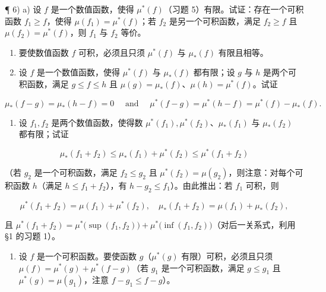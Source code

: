 ¶ 6) a) 设 \(f\) 是一个数值函数，使得 \(\mu^{*}(f)\)（习题 5）有限。试证：存在一个可积函数 \(f_{1} \geqslant f\)，使得 \(\mu(f_{1}) = \mu^{*}(f)\)；若 \(f_{2}\) 是另一个可积函数，满足 \(f_{2} \geqslant f\) 且 \(\mu(f_{2}) = \mu^{*}(f)\)，则 \(f_{1}\) 与 \(f_{2}\) 等价。

\begin{enumerate}
\def\labelenumi{\alph{enumi})}
\setcounter{enumi}{1}
\item
  要使数值函数 \(f\) 可积，必须且只须 \(\mu^{*}(f)\) 与 \(\mu_{*}(f)\) 有限且相等。
\item
  设 \(f\) 是一个数值函数，使得 \(\mu^{*}(f)\) 与 \(\mu_{*}(f)\) 都有限；设 \(g\) 与 \(h\) 是两个可积函数，满足 \(g \leqslant f \leqslant h\) 且 \(\mu(g) = \mu_{*}(f)\)、\(\mu(h) = \mu^{*}(f)\)。试证
\end{enumerate}

\[
\mu_ {*} (f - g) = \mu_ {*} (h - f) = 0 \quad \text { and } \quad \mu^ {*} (f - g) = \mu^ {*} (h - f) = \mu^ {*} (f) - \mu_ {*} (f).
\]

\begin{enumerate}
\def\labelenumi{\alph{enumi})}
\setcounter{enumi}{3}
\tightlist
\item
  设 \(f_{1}, f_{2}\) 是两个数值函数，使得数 \(\mu^{*}(f_{1}), \mu^{*}(f_{2})\)、\(\mu_{*}(f_{1})\) 与 \(\mu_{*}(f_{2})\) 都有限；试证
\end{enumerate}

\[
\mu_ {*} (f _ {1} + f _ {2}) \leqslant \mu_ {*} (f _ {1}) + \mu^ {*} (f _ {2}) \leqslant \mu^ {*} (f _ {1} + f _ {2})
\]

（若 \(g_2\) 是一个可积函数，满足 \(f_2 \leqslant g_2\) 且 \(\mu^*(f_2) = \mu(g_2)\)，则注意：对每个可积函数 \(h\)（满足 \(h \leqslant f_1 + f_2\)），有 \(h - g_2 \leqslant f_1\)）。由此推出：若 \(f_1\) 可积，则

\[
\mu^ {*} (f _ {1} + f _ {2}) = \mu (f _ {1}) + \mu^ {*} (f _ {2}), \quad \mu_ {*} (f _ {1} + f _ {2}) = \mu (f _ {1}) + \mu_ {*} (f _ {2}),
\]

且 \(\mu^{*}(f_{1} + f_{2}) = \mu^{*}\big(\sup (f_{1},f_{2})\big) + \mu^{*}\big(\inf (f_{1},f_{2})\big)\)（对后一关系式，利用 §1 的习题 1）。

\begin{enumerate}
\def\labelenumi{\alph{enumi})}
\setcounter{enumi}{4}
\tightlist
\item
  设 \(f\) 是一个可积函数。要使函数 \(g\)（\(\mu^{*}(g)\) 有限）可积，必须且只须 \(\mu(f) = \mu^{*}(g) + \mu^{*}(f - g)\)（若 \(g_{1}\) 是一个可积函数，满足 \(g \leqslant g_{1}\) 且 \(\mu^{*}(g) = \mu(g_{1})\)，注意 \(f - g_{1} \leqslant f - g\)）。
\end{enumerate}

